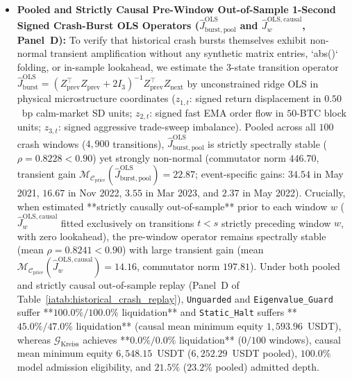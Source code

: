 \documentclass[12pt]{article}
\theoremstyle{definition}
\theoremstyle{remark}
\begin{document}
\begin{itemize}
\item \textbf{Pooled and Strictly Causal Pre-Window Out-of-Sample 1-Second Signed Crash-Burst OLS Operators ($\hat{J}_{\mathrm{burst,pool}}^{\mathrm{OLS}}$ and $\hat{J}_w^{\mathrm{OLS,causal}}$, Panel~D):} To verify that historical crash bursts themselves exhibit non-normal transient amplification without any synthetic matrix entries, `abs()` folding, or in-sample lookahead, we estimate the 3-state transition operator $\hat{J}_{\mathrm{burst}}^{\mathrm{OLS}} = (Z_{\mathrm{prev}}^\top Z_{\mathrm{prev}} + 2 I_3)^{-1} Z_{\mathrm{prev}}^\top Z_{\mathrm{next}}$ by unconstrained ridge OLS in physical microstructure coordinates ($z_{1,t}$: signed return displacement in $0.50$~bp calm-market SD units; $z_{2,t}$: signed fast EMA order flow in $50$-BTC block units; $z_{3,t}$: signed aggressive trade-sweep imbalance). Pooled across all $100$ crash windows ($4{,}900$ transitions), $\hat{J}_{\mathrm{burst,pool}}^{\mathrm{OLS}}$ is strictly spectrally stable ($\rho = 0.8228 < 0.90$) yet strongly non-normal (commutator norm $446.70$, transient gain $\mathcal{M}_{\mathcal{C}_{\mathrm{price}}}(\hat{J}_{\mathrm{burst,pool}}^{\mathrm{OLS}}) = 22.87$; event-specific gains: $34.54$ in May 2021, $16.67$ in Nov 2022, $3.55$ in Mar 2023, and $2.37$ in May 2022). Crucially, when estimated **strictly causally out-of-sample** prior to each window $w$ ($\hat{J}_w^{\mathrm{OLS,causal}}$ fitted exclusively on transitions $t < s$ strictly preceding window $w$, with zero lookahead), the pre-window operator remains spectrally stable (mean $\rho = 0.8241 < 0.90$) with large transient gain (mean $\mathcal{M}_{\mathcal{C}_{\mathrm{price}}}(\hat{J}_w^{\mathrm{OLS,causal}}) = 14.16$, commutator norm $197.81$). Under both pooled and strictly causal out-of-sample replay (Panel~D of Table~\ref{iatab:historical_crash_replay}), \texttt{Unguarded} and \texttt{Eigenvalue\_Guard} suffer **$100.0\% / 100.0\%$ liquidation** and \texttt{Static\_Halt} suffers **$45.0\% / 47.0\%$ liquidation** (causal mean minimum equity $1{,}593.96$~USDT), whereas $\mathcal{G}_{\mathrm{Kreiss}}$ achieves **$0.0\% / 0.0\%$ liquidation** ($0/100$ windows), causal mean minimum equity $6{,}548.15$~USDT ($6{,}252.29$~USDT pooled), $100.0\%$ model admission eligibility, and $21.5\%$ ($23.2\%$ pooled) admitted depth.
\end{itemize}


\end{document}
